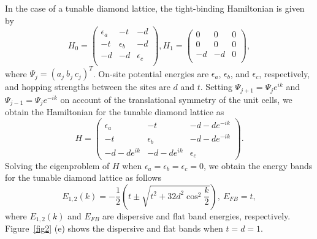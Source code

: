 \documentclass[twocolumn,showpacs,epsfig,pre]{revtex4}
\begin{document}
In the case of a tunable diamond lattice, the tight-binding Hamiltonian is given by
\begin{equation}
 H_0 = \left(\begin{array}{ccc}
 \epsilon_a & -t & -d \\
 -t & \epsilon_b & -d \\
 -d & -d & \epsilon_c \\
\end{array}\right),
 H_1 = \left(\begin{array}{ccc}
 0 & 0 & 0 \\
 0 & 0 & 0 \\
 -d & -d & 0 \\
\end{array}\right),
\end{equation}
where $\Psi_j = (a_j ~ b_j ~ c_j)^T$. On-site potential energies are $\epsilon_a$, $\epsilon_b$, and $\epsilon_c$, respectively, and hopping strengths between the sites are $d$ and $t$. Setting $\Psi_{j+1} = \Psi_j e^{ik}$ and $\Psi_{j-1} = \Psi_j e^{-ik}$ on account of the translational symmetry of the unit cells,
we obtain the Hamiltonian for the tunable diamond lattice as
\begin{equation}
 H = \left(\begin{array}{ccc}
 \epsilon_a & -t & -d-d e^{-ik} \\
 -t & \epsilon_b & -d-d e^{-ik} \\
 -d-d e^{ik} & -d-d e^{ik} & \epsilon_c
\end{array}\right).
\end{equation}
Solving the eigenproblem of $H$ when $\epsilon_a = \epsilon_b = \epsilon_c = 0$,
we obtain the energy bands for the tunable diamond lattice as follows
\begin{equation}
E_{1,2}(k) = -\frac{1}{2} \left(t \pm \sqrt{t^2 + 32 d^2 \cos^2{\frac{k}{2}}} \right), ~E_{FB}=t,
\end{equation}
where $E_{1,2}(k)$ and $E_{FB}$ are dispersive and flat band energies, respectively. Figure~\ref{fig2} (e) shows the dispersive and flat bands when $t=d=1$.
\end{document}
